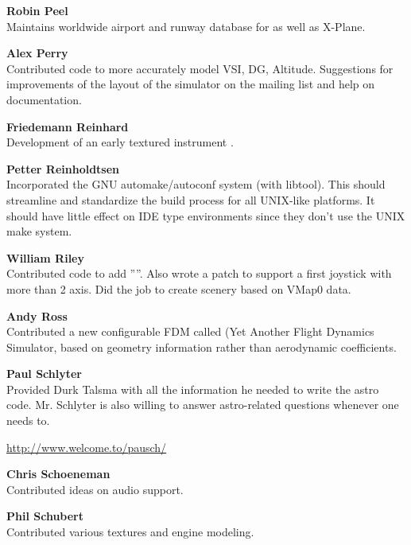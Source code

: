 \noindent \textbf{Robin Peel}\\
  Maintains worldwide airport and runway database for \FlightGear{} as well as X-Plane.
 \medskip

\noindent \textbf{Alex Perry}\\
 Contributed code to more accurately model VSI, DG, Altitude.
 Suggestions for improvements of the layout of the simulator on the mailing list
 and help on documentation.
 \medskip

\noindent \textbf{Friedemann Reinhard}\\
  Development of an early textured instrument .
 \medskip

\noindent \textbf{Petter Reinholdtsen}\\
  Incorporated the GNU automake/autoconf system (with libtool).
  This should streamline and standardize the build process for all
  UNIX-like platforms.  It should have little effect on IDE type
  environments since they don't use the UNIX make system.
 \medskip

\noindent \textbf{William Riley}\\
  Contributed code to add ''''. Also wrote a patch to support a first  joystick with more than 2 axis. Did the job to create scenery based on VMap0 data.
 \medskip

\noindent \textbf{Andy Ross}\\
 Contributed a new configurable FDM called \YASim{} (Yet Another Flight Dynamics Simulator, based on geometry information rather than aerodynamic coefficients.
 \medskip

\noindent \textbf{Paul Schlyter}\\
  Provided Durk Talsma with all the information he needed to write the
  astro code. Mr. Schlyter is also willing to answer astro-related questions
  whenever one needs to.
  \medskip

  \href{http://www.welcome.to/pausch/}{http://www.welcome.to/pausch/}
 \medskip

\noindent \textbf{Chris Schoeneman}\\
  Contributed ideas on audio support.
 \medskip

\noindent \textbf{Phil Schubert}\\
  Contributed various textures and engine modeling.
   \medskip

